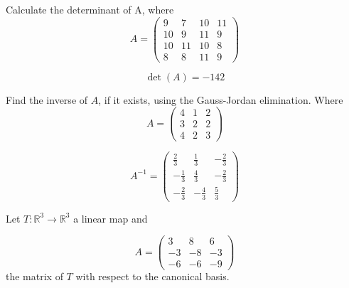 \begin{questions}

\question Calculate the determinant of A, where
$$
A=\left(\begin{array}{rrrr}
9 & 7 & 10 & 11 \\
10 & 9 & 11 & 9 \\
10 & 11 & 10 & 8 \\
8 & 8 & 11 & 9
\end{array}\right)
$$

\begin{solution}
$$\det(A)=-142$$
\end{solution}

\question Find the inverse of $A$, if it exists, using the Gauss-Jordan elimination. Where
$$
A=\left(\begin{array}{rrr}
4 & 1 & 2 \\
3 & 2 & 2 \\
4 & 2 & 3
\end{array}\right)
$$

\begin{solution}
$$A^{-1}=\left(\begin{array}{rrr}
\frac{2}{3} & \frac{1}{3} & -\frac{2}{3} \\
-\frac{1}{3} & \frac{4}{3} & -\frac{2}{3} \\
-\frac{2}{3} & -\frac{4}{3} & \frac{5}{3}
\end{array}\right)$$
\end{solution}

\question Let $T:\mathbb{R}^3\rightarrow\mathbb{R}^3$  a linear map and
 
$$
A=\left(\begin{array}{rrr}
3 & 8 & 6 \\
-3 & -8 & -3 \\
-6 & -6 & -9
\end{array}\right)
$$
the matrix of $T$ with respect to the canonical basis.
\end{questions}
